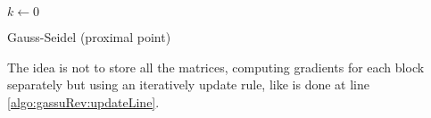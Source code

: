 \documentclass{article}
\begin{document}
\begin{algorithm}[]
	$k \gets 0$\\
	\caption{Gauss-Seidel (proximal point)}
	\label{algo:gaussSeidelRevised}
\end{algorithm}

The idea is not to store all the matrices, computing gradients for each block separately but using an iteratively update rule, like is done at line \ref{algo:gassuRev:updateLine}.
	
	
\end{document}
